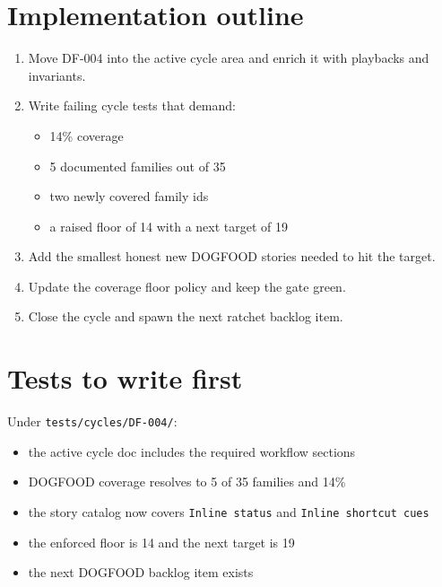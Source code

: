 \section{Implementation outline}\label{record-066-implementation-outline}

\begin{enumerate}
\def\labelenumi{\arabic{enumi}.}
\tightlist
\item
  Move DF-004 into the active cycle area and enrich it with playbacks and invariants.
\item
  Write failing cycle tests that demand:

  \begin{itemize}
  \tightlist
  \item
    14\% coverage
  \item
    5 documented families out of 35
  \item
    two newly covered family ids
  \item
    a raised floor of 14 with a next target of 19
  \end{itemize}
\item
  Add the smallest honest new DOGFOOD stories needed to hit the target.
\item
  Update the coverage floor policy and keep the gate green.
\item
  Close the cycle and spawn the next ratchet backlog item.
\end{enumerate}

\section{Tests to write first}\label{record-066-tests-to-write-first}

Under \texttt{t\allowbreak{}e\allowbreak{}s\allowbreak{}t\allowbreak{}s\allowbreak{}/\allowbreak{}c\allowbreak{}y\allowbreak{}c\allowbreak{}l\allowbreak{}e\allowbreak{}s\allowbreak{}/\allowbreak{}D\allowbreak{}F\allowbreak{}-\allowbreak{}0\allowbreak{}0\allowbreak{}4\allowbreak{}/}:

\begin{itemize}
\tightlist
\item
  the active cycle doc includes the required workflow sections
\item
  DOGFOOD coverage resolves to 5 of 35 families and 14\%
\item
  the story catalog now covers \texttt{I\allowbreak{}n\allowbreak{}l\allowbreak{}i\allowbreak{}n\allowbreak{}e\allowbreak{} \allowbreak{}s\allowbreak{}t\allowbreak{}a\allowbreak{}t\allowbreak{}u\allowbreak{}s} and \texttt{I\allowbreak{}n\allowbreak{}l\allowbreak{}i\allowbreak{}n\allowbreak{}e\allowbreak{} \allowbreak{}s\allowbreak{}h\allowbreak{}o\allowbreak{}r\allowbreak{}t\allowbreak{}c\allowbreak{}u\allowbreak{}t\allowbreak{} \allowbreak{}c\allowbreak{}u\allowbreak{}e\allowbreak{}s}
\item
  the enforced floor is 14 and the next target is 19
\item
  the next DOGFOOD backlog item exists
\end{itemize}


